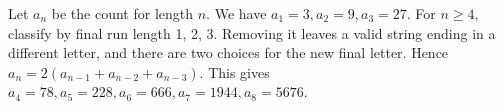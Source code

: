 Let $a_n$ be the count for length $n$. We have $a_1=3,a_2=9,a_3=27$. For $n\ge4$, classify by final run length 1, 2, 3. Removing it leaves a valid string ending in a different letter, and there are two choices for the new final letter. Hence $a_n=2(a_{n-1}+a_{n-2}+a_{n-3})$. This gives $a_4=78,a_5=228,a_6=666,a_7=1944,a_8=\boxed{5676}$.
